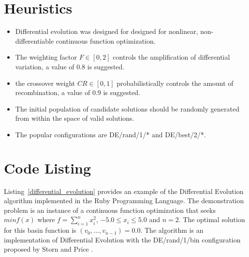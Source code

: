 \documentclass[a4paper, 11pt]{article}
\begin{document}
\section{Heuristics}
\label{sec:heuristics}
\begin{itemize}
	\item Differential evolution was designed for designed for nonlinear, non-differentiable continuous function optimization.
	\item The weighting factor $F \in [0,2]$ controls the amplification of differential variation, a value of 0.8 is suggested.
	\item the crossover weight $CR \in [0,1]$ probabilistically controls the amount of recombination, a value of 0.9 is suggested.
	\item The initial population of candidate solutions should be randomly generated from within the space of valid solutions.
	\item The popular configurations are DE/rand/1/* and DE/best/2/*. 
\end{itemize}

\section{Code Listing}
\label{sec:code}
Listing~\ref{differential_evolution} provides an example of the Differential Evolution algorithm implemented in the Ruby Programming Language.
The demonstration problem is an instance of a continuous function optimization that seeks $min f(x)$ where $f=\sum_{i=1}^n x_{i}^2$, $-5.0\leq x_i \leq 5.0$ and $n=2$. The optimal solution for this basin function is $(v_0,\ldots,v_{n-1})=0.0$.
The algorithm is an implementation of Differential Evolution with the DE/rand/1/bin configuration proposed by Storn and Price \cite{Storn1997}.
\end{document}
